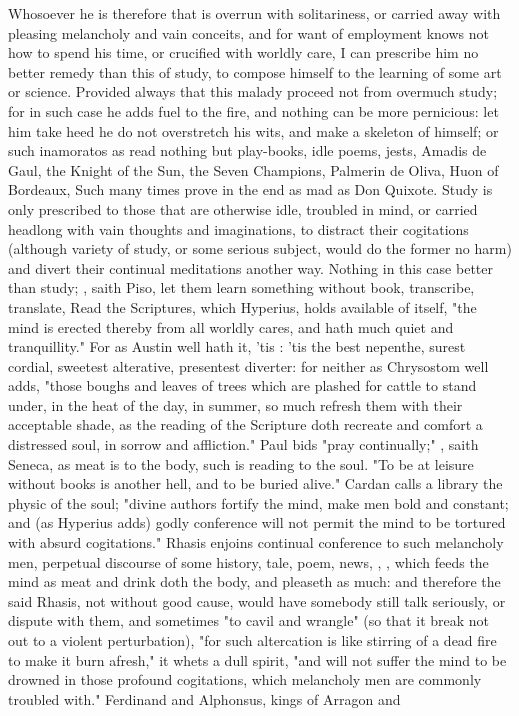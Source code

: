 {Whosoever he is therefore that is overrun with solitariness, or carried away with pleasing melancholy and vain conceits, and for want of employment knows not how to spend his time, or crucified with worldly care, I can prescribe him no better remedy than this of study, to compose himself to the learning of some art or science. Provided always that this malady proceed not from overmuch study; for in such case he adds fuel to the fire, and nothing can be more pernicious: let him take heed he do not overstretch his wits, and make a skeleton of himself; or such inamoratos as read nothing but play-books, idle poems, jests, Amadis de Gaul, the Knight of the Sun, the Seven Champions, Palmerin de Oliva, Huon of Bordeaux, \etc{} Such many times prove in the end as mad as Don Quixote. Study is only prescribed to those that are otherwise idle, troubled in mind, or carried headlong with vain thoughts and imaginations, to distract their cogitations (although variety of study, or some serious subject, would do the former no harm) and divert their continual meditations another way. Nothing in this case better than study; , saith Piso, let them learn something without book, transcribe, translate, \etc{} Read the Scriptures, which Hyperius,  holds available of itself, "the mind is erected thereby from all worldly cares, and hath much quiet and tranquillity." For as Austin well hath it, 'tis : 'tis the best nepenthe, surest cordial, sweetest alterative, presentest diverter: for neither as Chrysostom well adds, "those boughs and leaves of trees which are plashed for cattle to stand under, in the heat of the day, in summer, so much refresh them with their acceptable shade, as the reading of the Scripture doth recreate and comfort a distressed soul, in sorrow and affliction." Paul bids "pray continually;" , saith Seneca, as meat is to the body, such is reading to the soul. "To be at leisure without books is another hell, and to be buried alive." Cardan calls a library the physic of the soul; "divine authors fortify the mind, make men bold and constant; and (as Hyperius adds) godly conference will not permit the mind to be tortured with absurd cogitations." Rhasis enjoins continual conference to such melancholy men, perpetual discourse of some history, tale, poem, news, \etc{}, , which feeds the mind as meat and drink doth the body, and pleaseth as much: and therefore the said Rhasis, not without good cause, would have somebody still talk seriously, or dispute with them, and sometimes "to cavil and wrangle" (so that it break not out to a violent perturbation), "for such altercation is like stirring of a dead fire to make it burn afresh," it whets a dull spirit, "and will not suffer the mind to be drowned in those profound cogitations, which melancholy men are commonly troubled with." Ferdinand and Alphonsus, kings of Arragon and }
